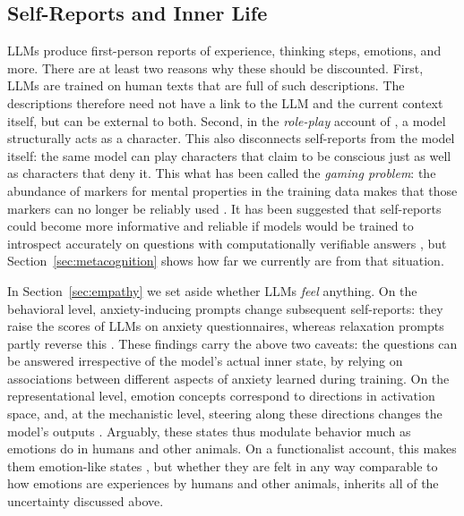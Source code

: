 \subsection{Self-Reports and Inner Life}\label{sec:selfreports}
LLMs produce first-person reports of experience, thinking steps, emotions, and more. There are at least two reasons why these should be discounted. First, LLMs are trained on human texts that are full of such descriptions. The descriptions therefore need not have a link to the LLM and the current context itself, but can be external to both. Second, in the \emph{role-play} account of \citet{shanahan2023roleplaylargelanguagemodels}, a model structurally acts as a character. This also disconnects self-reports from the model itself: the same model can play characters that claim to be conscious just as well as characters that deny it. This what has been called the \emph{gaming problem}: the abundance of markers for mental properties in the training data makes that those markers can no longer be reliably used \citep{birch2024gaming}. It has been suggested that self-reports could become more informative and reliable if models would be trained to introspect accurately on questions with computationally verifiable answers \citep{perez2023eval}, but Section~\ref{sec:metacognition} shows how far we currently are from that situation.

In Section~\ref{sec:empathy} we set aside whether LLMs \emph{feel} anything. On the behavioral level, anxiety-inducing prompts change subsequent self-reports: they raise the scores of LLMs on anxiety questionnaires, whereas relaxation prompts partly reverse this \citep{BenZion2026anxiety}. These findings carry the above two caveats: the questions can be answered irrespective of the model's actual inner state, by relying on associations between different aspects of anxiety learned during training. On the representational level, emotion concepts correspond to directions in activation space, and, at the mechanistic level, steering along these directions changes the model's outputs \citep{zou2023representation}. Arguably, these states thus modulate behavior much as emotions do in humans and other animals. On a functionalist account, this makes them emotion-like states \citep{Moerland2018emotion}, but whether they are felt in any way comparable to how emotions are experiences by humans and other animals, inherits all of the uncertainty discussed above.

